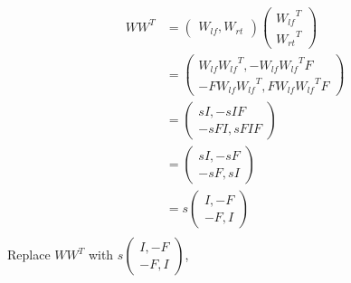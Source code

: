 \documentclass[]{article}
\begin{document}
\begin{align}
{W}{W}^{T}&=\begin{pmatrix} W_{lf},  W_{rt} \end{pmatrix} \begin{pmatrix} {W_{lf}}^{T} \\  {W_{rt}}^{T} \end{pmatrix} \\
&=\begin{pmatrix} W_{lf}{W_{lf}}^{T}, -W_{lf}{W_{lf}}^{T}F \\ -FW_{lf}{W_{lf}}^{T},  FW_{lf}{W_{lf}}^{T}F \end{pmatrix}  \\
&=\begin{pmatrix} sI, -sIF \\ -sFI,  sFIF \end{pmatrix}  \\
&=\begin{pmatrix} sI, -sF \\ -sF,  sI \end{pmatrix}  \\
&=s\begin{pmatrix} I, -F \\ -F,  I \end{pmatrix}  \\
\end{align}
Replace ${W}{W}^{T}$ with $s\begin{pmatrix} I, -F \\ -F,  I \end{pmatrix}$,
\end{document}
